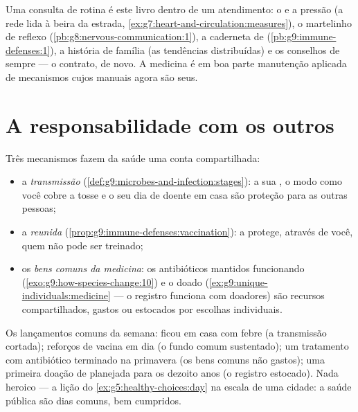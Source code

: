 \begin{example}\label{ex:g9:our-responsibility:checkup}
Uma consulta de rotina é este livro dentro de um atendimento:
o  e a pressão (a rede lida à beira da estrada,
\cref{ex:g7:heart-and-circulation:measures}), o martelinho de
reflexo (\cref{pb:g8:nervous-communication:1}), a caderneta
de  (\cref{pb:g9:immune-defenses:1}), a história de
família (as tendências distribuídas) e os conselhos de sempre
--- o contrato, de novo. A medicina é em boa parte manutenção
aplicada de mecanismos cujos manuais agora são seus.
\end{example}

\section{A responsabilidade com os outros}

\begin{proposition}\label{prop:g9:our-responsibility:others}
Três mecanismos fazem da saúde uma conta compartilhada:
\begin{itemize}
  \item a \emph{transmissão}
        (\cref{def:g9:microbes-and-infection:stages}): a sua
        , o modo como você cobre a tosse e o seu dia
        de doente em casa são proteção para as outras
        pessoas;
  \item a \emph{ reunida}
        (\cref{prop:g9:immune-defenses:vaccination}): a
         protege, através de você, quem não pode ser
        treinado;
  \item os \emph{bens comuns da medicina}: os antibióticos
        mantidos funcionando
        (\cref{exo:g9:how-species-change:10}) e o 
        doado (\cref{ex:g9:unique-individuals:medicine} --- o
        registro funciona com doadores) são recursos
        compartilhados, gastos ou estocados por escolhas
        individuais.
\end{itemize}
\end{proposition}
\admitted

\begin{example}\label{ex:g9:our-responsibility:account}
Os lançamentos comuns da semana: ficou em casa com febre (a
transmissão cortada); reforços de vacina em dia (o fundo
comum sustentado); um tratamento com antibiótico terminado na
primavera (os bens comuns não gastos); uma primeira doação de
 planejada para os dezoito anos (o registro estocado).
Nada heroico --- a lição do \cref{ex:g5:healthy-choices:day}
na escala de uma cidade: a saúde pública são dias comuns, bem
cumpridos.
\end{example}

